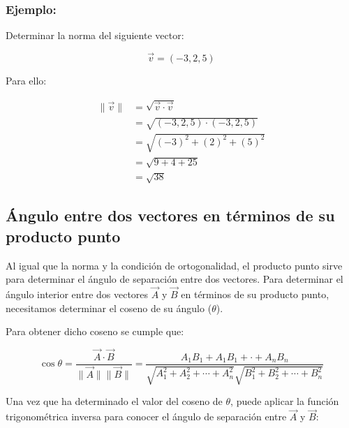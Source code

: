 \documentclass{article}
\begin{document}
        \subsubsection*{Ejemplo:}

        Determinar la norma del siguiente vector:

        \begin{equation*}
            \vec{v}=(-3,2,5)
        \end{equation*}

        Para ello:

        \begin{equation*}
            \begin{aligned}
            \parallel \vec{v}\parallel &=\sqrt{\vec{v} \cdot \vec{v}} \\
            &=\sqrt{(-3,2,5) \cdot(-3,2,5)} \\
            &=\sqrt{(-3)^{2}+(2)^{2}+(5)^{2}} \\
            &=\sqrt{9+4+25} \\
            &=\sqrt{38}
            \end{aligned}
        \end{equation*}

    \subsection{Ángulo entre dos vectores en términos de su producto punto}

        Al igual que la norma y la condición de ortogonalidad, el producto punto sirve para determinar el ángulo de separación entre dos vectores. Para determinar el ángulo interior entre dos vectores $\vec{A}$ y $\vec{B}$ en términos de su producto punto, necesitamos determinar el coseno de su ángulo ($\theta$).

        Para obtener dicho coseno se cumple que:

        \begin{equation}
            \cos \theta = \frac{\vec{A} \cdot \vec{B}}{\parallel\vec{A}\parallel\parallel\vec{B}\parallel} = \frac{A_{1} B_{1}+A_{1} B_{1}+\cdot+A_{n} B_{n}}{\sqrt{A_{1}^{2}+A_{2}^{2}+\cdots+A_{n}^{2}} \sqrt{B_{1}^{2}+B_{2}^{2}+\cdots+B_{n}^{2}}}
        \end{equation}

        Una vez que ha determinado el valor del coseno de $\theta$, puede aplicar la función trigonométrica inversa para conocer el ángulo de separación entre $\vec{A}$ y $\vec{B}$:
\end{document}

